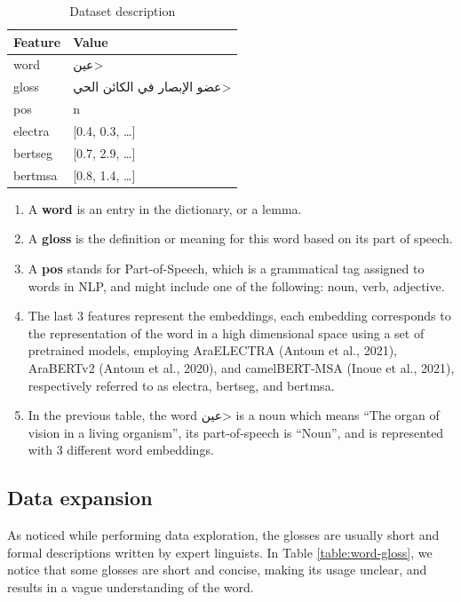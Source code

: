 \documentclass[15pt]{article}
\begin{document}
\begin{table}[H]
    \centering
    \caption{Dataset description}
    \label{table:dataset-desc}
    \renewcommand{\arraystretch}{1.5}%
    \begin{tabularx}{\textwidth}{|l|X|}
        \hline
        \textbf{Feature} & \textbf{Value} \\
        \hline
        word & \<عين> \\
        \hline
        gloss & \<عضو الإبصار في الكائن الحي> \\
        \hline
        pos & n \\
        \hline
        electra & [0.4, 0.3, …] \\
        \hline
        bertseg & [0.7, 2.9, …] \\
        \hline
        bertmsa & [0.8, 1.4, …] \\
        \hline
    \end{tabularx}
\end{table}

\begin{enumerate}
    \item A \textbf{word} is an entry in the dictionary, or a lemma.
    \item A \textbf{gloss} is the definition or meaning for this word based on its part of speech.
    \item A \textbf{pos} stands for Part-of-Speech, which is a grammatical tag assigned to words in NLP, and might include one of the following: noun, verb, adjective.
    \item The last 3 features represent the embeddings, each embedding corresponds to the representation of the word in a high dimensional space using a set of pretrained models, employing AraELECTRA (Antoun et al., 2021), AraBERTv2 (Antoun et al., 2020), and camelBERT-MSA (Inoue et al., 2021), respectively referred to as electra, bertseg, and bertmsa.
    \item In the previous table, the word \<عين> is a noun which means “The organ of vision in a living organism”, its part-of-speech is “Noun”, and is represented with 3 different word embeddings.
\end{enumerate}

\subsection{Data expansion}

As noticed while performing data exploration, the glosses are usually short and formal descriptions written by expert linguists. In Table \ref{table:word-gloss}, we notice that some glosses are short and concise, making its usage unclear, and results in a vague understanding of the word.
\end{document}
